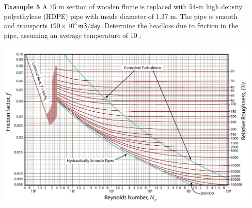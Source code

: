 \documentclass[10pt]{amsart}
\begin{document}
	
	\newpage
	
	
	\textbf{Example 5}
	A 75 m section of wooden flume is replaced with 54-in high
density polyethylene (HDPE) pipe with inside diameter of
1.37 m. The pipe is smooth and transports $ 190 \times 10^3\mathsf{\, m3/day}$.
Determine the headloss due to friction in the pipe, assuming
an average temperature of 10 \textcelsius.\par\medskip
	
	\begin{center}
		\includegraphics[scale=1.1, angle=90]{../../figs/05FrictionLosses/moody.pdf}
	\end{center}
	
	
	\newpage
\end{document}
